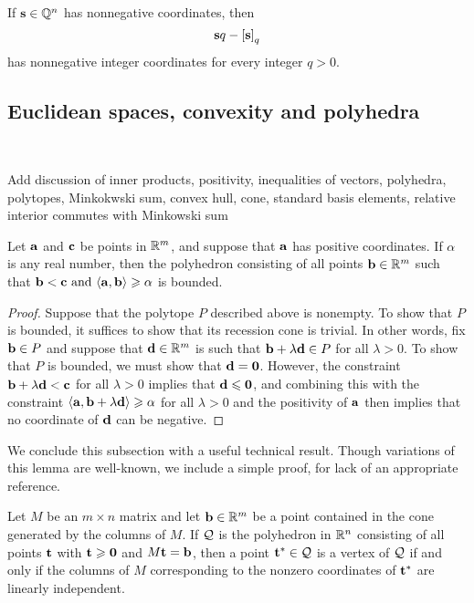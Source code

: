 \documentclass[11pt]{amsart}
\begin{document}
\begin{remark}  If $\mathbf{s} \in \mathbb{Q}^n$ has nonnegative coordinates, then \[ \mathbf{s}q - \left[ \mathbf{s} \right]_q \] has nonnegative integer coordinates for every integer $q>0$.
\end{remark}


\subsection{Euclidean spaces, convexity and polyhedra} 
\ 


 \alert[inline]{Add discussion of inner products, positivity, inequalities of vectors, polyhedra, polytopes, Minkokwski sum, convex hull, cone, standard basis elements, relative interior commutes with Minkowski sum}


\begin{lemma}  
\label{bounded polytope: L}
Let $\mathbf{a}$ and $\mathbf{c}$ be points in $\mathbb{R}^m$, and suppose that $\mathbf{a}$ has positive coordinates.    If $\alpha$ is any real number, then the polyhedron consisting of all points $\mathbf{b} \in \mathbb{R}^m$ such that  $\mathbf{b} < \mathbf{c} \text{ and } \langle \mathbf{a}, \mathbf{b} \rangle \geqslant \alpha$ is bounded.
\end{lemma}

\begin{proof}  Suppose that the polytope $P$ described above is nonempty.   To show that $P$ is bounded, it suffices to show that its recession cone is trivial.  In other words, fix $\mathbf{b} \in P$ and suppose that $\mathbf{d} \in \mathbb{R}^m$ is such that $\mathbf{b} + \lambda \mathbf{d} \in P$ for all $\lambda > 0$.  To show that $P$ is bounded, we must show that $\mathbf{d} = \mathbf{0}$.   However,  the constraint $\mathbf{b} + \lambda \mathbf{d} < \mathbf{c}$ for all $\lambda>0$ implies that $\mathbf{d} \leqslant \mathbf{0}$, and combining this with the constraint $\langle \mathbf{a}, \mathbf{b} + \lambda \mathbf{d} \rangle \geqslant \alpha$ for all $\lambda > 0$ and the positivity of $\mathbf{a}$ then implies that no coordinate of $\mathbf{d}$ can be negative.
\end{proof}

We conclude this subsection with a useful technical result.  Though variations of this lemma are well-known, we include a simple proof, for lack of an appropriate reference.


\begin{lemma}  
\label{vertex: L}
Let $M$ be an $m \times n$ matrix and let $\mathbf{b} \in \mathbb{R}^m$ be a point contained in the cone generated by the columns of $M$.  If $\mathcal{Q}$ is the polyhedron in $\mathbb{R}^n$  consisting of all points $\mathbf{t}$ with $\mathbf{t} \geqslant \mathbf{0}$ and $M \mathbf{t} = \mathbf{b}$, then a point $\mathbf{t}^{\ast} \in \mathcal{Q}$ is a vertex of $\mathcal{Q}$ if and only if the columns of $M$ corresponding to the nonzero coordinates of $\mathbf{t}^{\ast}$ are linearly independent.  %
\end{lemma}
\end{document}

